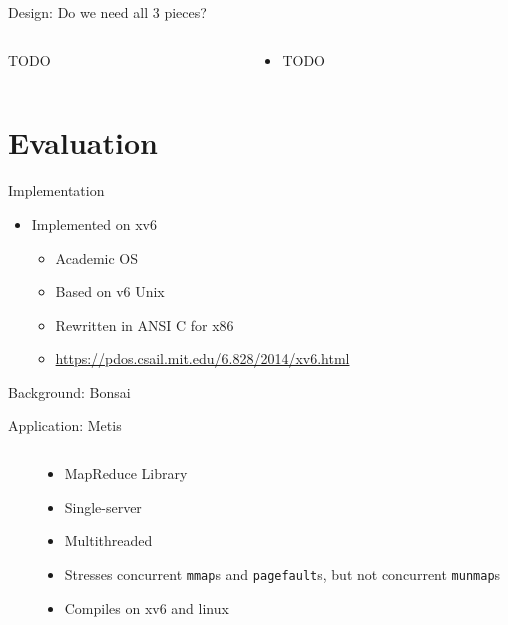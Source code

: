 \documentclass[aspectratio=169]{beamer}
\newcommand{\bi}{\begin{itemize}}
\newcommand{\ei}{\end{itemize}}
\begin{document}
\begin{frame}{Design: Do we need all 3 pieces?}
  \begin{columns}[T]
    \begin{column}{0.2\textwidth}
      TODO
    \end{column}
    \begin{column}{0.8\textwidth}
      \bi
    \item TODO
      \ei
    \end{column}
  \end{columns}
\end{frame}

\section{Evaluation}

\begin{frame}{Implementation}
  \begin{center}
    \bi
  \item Implemented on xv6
    \bi
  \item Academic OS
  \item Based on v6 Unix
  \item Rewritten in ANSI C for x86
  \item \url{https://pdos.csail.mit.edu/6.828/2014/xv6.html}
    \ei
    \ei
  \end{center}
\end{frame}

\begin{frame}{Background: Bonsai}
  \begin{center}
    \bi
    
    \ei
  \end{center}
\end{frame}

\begin{frame}{Application: Metis}
  \begin{columns}[T]
    \begin{column}{0.5\textwidth}
      
    \end{column}
    \begin{column}{0.5\textwidth}
      \bi
    \item MapReduce Library
    \item Single-server
    \item Multithreaded
    \item Stresses concurrent \texttt{mmap}s and \texttt{pagefault}s, but not concurrent \texttt{munmap}s
    \item Compiles on xv6 and linux
      \ei
    \end{column}
  \end{columns}
\end{frame}
\end{document}
